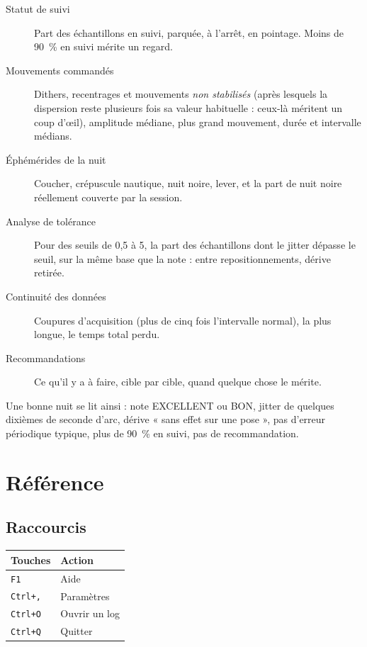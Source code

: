 \begin{description}
  \item[Statut de suivi] Part des échantillons en suivi, parquée, à l'arrêt, en
  pointage. Moins de 90~\% en suivi mérite un regard.

  \item[Mouvements commandés] Dithers, recentrages et mouvements \emph{non
  stabilisés} (après lesquels la dispersion reste plusieurs fois sa valeur
  habituelle : ceux-là méritent un coup d'œil), amplitude médiane, plus grand
  mouvement, durée et intervalle médians.

  \item[Éphémérides de la nuit] Coucher, crépuscule nautique, nuit noire,
  lever, et la part de nuit noire réellement couverte par la session.

  \item[Analyse de tolérance] Pour des seuils de 0,5 à 5\arcsec, la part des
  échantillons dont le jitter dépasse le seuil, sur la même base que la note :
  entre repositionnements, dérive retirée.

  \item[Continuité des données] Coupures d'acquisition (plus de cinq fois
  l'intervalle normal), la plus longue, le temps total perdu.

  \item[Recommandations] Ce qu'il y a à faire, cible par cible, quand quelque
  chose le mérite.
\end{description}

\begin{tip}
Une bonne nuit se lit ainsi : note EXCELLENT ou BON, jitter de quelques
dixièmes de seconde d'arc, dérive « sans effet sur une pose », pas d'erreur
périodique typique, plus de 90~\% en suivi, pas de recommandation.
\end{tip}

\chapter{Référence}
\label{ch:ref}

\section{Raccourcis}

\begin{center}
\begin{tabularx}{\textwidth}{lX}
\toprule
\textbf{Touches} & \textbf{Action} \\
\midrule
\texttt{F1} & Aide \\
\texttt{Ctrl+,} & Paramètres \\
\texttt{Ctrl+O} & Ouvrir un log \\
\texttt{Ctrl+Q} & Quitter \\
\bottomrule
\end{tabularx}
\end{center}

